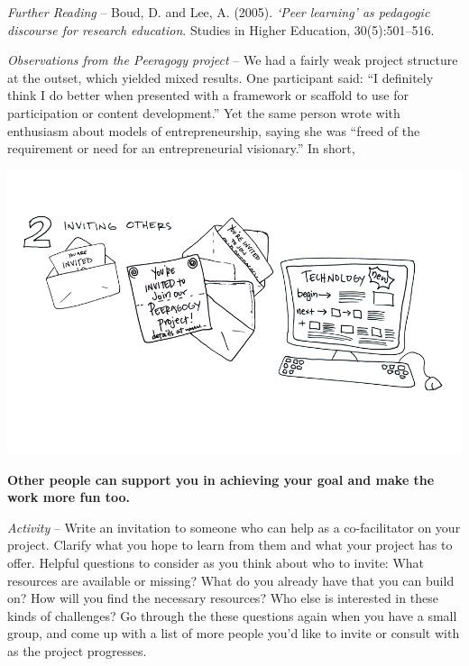 \medskip

\emph{Further Reading} -- Boud, D. and Lee, A. (2005). \emph{`Peer
learning' as pedagogic discourse for research education}. Studies in
Higher Education, 30(5):501--516.

\medskip

\emph{Observations from the Peeragogy project} -- We had a fairly weak
project structure at the outset, which yielded mixed results. One
participant said: ``I definitely think I do better when presented with a
framework or scaffold to use for participation or content development.''
Yet the same person wrote with enthusiasm about models of
entrepreneurship, saying she was ``freed of the requirement or need for
an entrepreneurial visionary.'' In short,

\begin{center}
\includegraphics{../pictures/OpenBook-2-2.jpg}
\end{center}

\textbf{Other people can support you in achieving your goal and make the
work more fun too.}

\medskip

\emph{Activity} -- Write an invitation to someone who can help as a
co-facilitator on your project. Clarify what you hope to learn from them
and what your project has to offer. Helpful questions to consider as you
think about who to invite: What resources are available or missing? What
do you already have that you can build on? How will you find the
necessary resources? Who else is interested in these kinds of
challenges? Go through the these questions again when you have a small
group, and come up with a list of more people you'd like to invite or
consult with as the project progresses.

